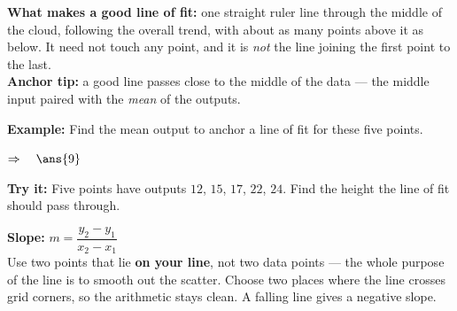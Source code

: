 \documentclass[12pt]{article}
\begin{document}


\begin{formulabox}
\textbf{What makes a good line of fit:} one straight ruler line through the middle of the cloud,
following the overall trend, with about as many points above it as below. It need not touch any
point, and it is \textit{not} the line joining the first point to the last.\\[3pt]
\textbf{Anchor tip:} a good line passes close to the middle of the data --- the middle input paired
with the \textit{mean} of the outputs.
\end{formulabox}

\begin{examplebox}
\textbf{Example:} \quad Find the mean output to anchor a line of fit for these five points.
\begin{center}
\end{center}
$\Rightarrow\quad \ans{9}$
\end{examplebox}

\begin{tryitbox}
\textbf{Try it:} \quad Five points have outputs $12$, $15$, $17$, $22$, $24$. Find the height the
line of fit should pass through.\\[2pt]
\end{tryitbox}


\begin{formulabox}
\textbf{Slope:} \quad $m = \dfrac{y_2 - y_1}{x_2 - x_1}$\\[3pt]
Use two points that lie \textbf{on your line}, not two data points --- the whole purpose of the
line is to smooth out the scatter. Choose two places where the line crosses grid corners, so the
arithmetic stays clean. A falling line gives a negative slope.
\end{formulabox}
\end{document}
